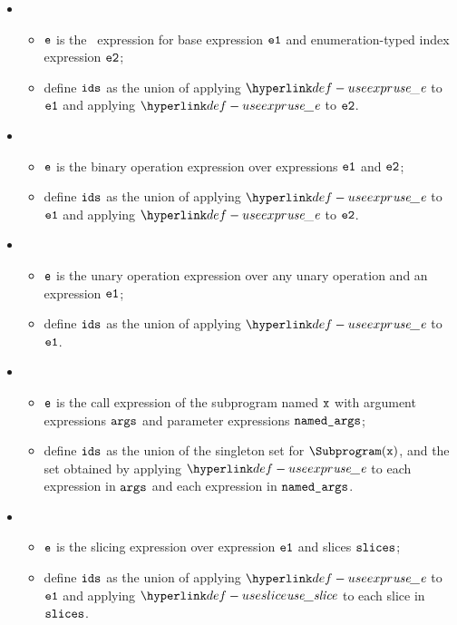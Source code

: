 \begin{itemize}
  \item {}
  \begin{itemize}
    \item $\texttt{e}$ is the \arrayaccessterm\ expression for base expression $\texttt{e1}$ and enumeration-typed index expression $\texttt{e2}$;
    \item define $\texttt{ids}$ as the union of applying $\useexpr$ to $\texttt{e1}$ and applying $\useexpr$ to $\texttt{e2}$.
  \end{itemize}

  \item {}
  \begin{itemize}
    \item $\texttt{e}$ is the binary operation expression over expressions $\texttt{e1}$ and $\texttt{e2}$;
    \item define $\texttt{ids}$ as the union of applying $\useexpr$ to $\texttt{e1}$ and applying $\useexpr$ to $\texttt{e2}$.
  \end{itemize}

  \item {}
  \begin{itemize}
    \item $\texttt{e}$ is the unary operation expression over any unary operation and an expression $\texttt{e1}$;
    \item define $\texttt{ids}$ as the union of applying $\useexpr$ to $\texttt{e1}$.
  \end{itemize}

  \item {}
  \begin{itemize}
    \item $\texttt{e}$ is the call expression of the subprogram named $\texttt{x}$ with argument expressions $\texttt{args}$ and parameter expressions $\texttt{named\_args}$;
    \item define $\texttt{ids}$ as the union of the singleton set for $\Subprogram(\vx)$, and the set obtained by applying $\useexpr$ to each expression in
          $\texttt{args}$ and each expression in $\texttt{named\_args}$.
  \end{itemize}

  \item {}
  \begin{itemize}
    \item $\texttt{e}$ is the slicing expression over expression $\texttt{e1}$ and slices $\texttt{slices}$;
    \item define $\texttt{ids}$ as the union of applying $\useexpr$ to $\texttt{e1}$ and applying $\useslice$ to each slice in $\texttt{slices}$.
  \end{itemize}


\end{itemize}
